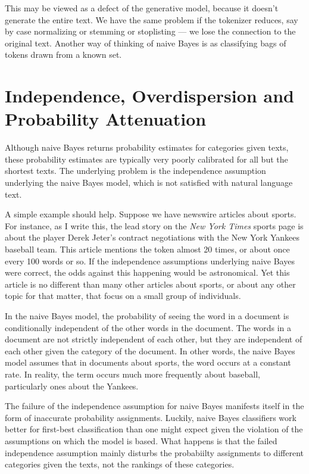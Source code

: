 This may be viewed as a defect of the generative model, because it
doesn't generate the entire text.  We have the same problem if the
tokenizer reduces, say by case normalizing or stemming or stoplisting
--- we lose the connection to the original text.  Another way of
thinking of naive Bayes is as classifying bags of tokens drawn
from a known set. 


\section{Independence, Overdispersion and Probability Attenuation}

Although naive Bayes returns probability estimates for categories
given texts, these probability estimates are typically very poorly
calibrated for all but the shortest texts.  The underlying problem is
the independence assumption underlying the naive Bayes model, which
is not satisfied with natural language text.  

A simple example should help.  Suppose we have newswire articles about
sports.  For instance, as I write this, the lead story on the {\it New
  York Times} sports page is about the player Derek Jeter's contract
negotiations with the New York Yankees baseball team.  This article
mentions the token  almost 20 times, or about
once every 100 words or so.  If the independence assumptions
underlying naive Bayes were correct, the odds against this happening
would be astronomical.  Yet this article is no different than many
other articles about sports, or about any other topic for that matter,
that focus on a small group of individuals.

In the naive Bayes model, the probability of seeing the word
 in a document is conditionally independent of
the other words in the document.  The words in a document are
not strictly independent of each other, but they are independent
of each other given the category of the document.  In other words,
the naive Bayes model assumes that in documents about sports,
the word  occurs at a constant rate.  In
reality, the term  occurs much more frequently
about baseball, particularly ones about the Yankees.

The failure of the independence assumption for naive Bayes manifests
itself in the form of inaccurate probability assignments.  Luckily,
naive Bayes classifiers work better for first-best classification than
one might expect given the violation of the assumptions on which the
model is based.  What happens is that the failed independence
assumption mainly disturbs the probabiilty assignments to different
categories given the texts, not the rankings of these categories.

